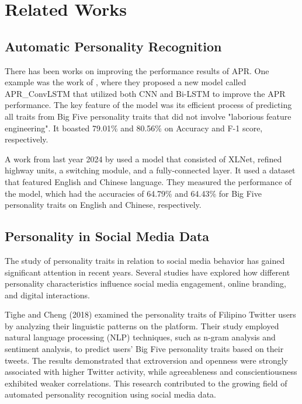 %
%
%                 

\chapter{Related Works}
\label{sec:Related Works}

\section {Automatic Personality Recognition}
\label{sec: APRecognition}
There has been works on improving the performance results of APR. One example was the work of \citet{Aljuhani_Al-Malaise Al-Ghamdi_Alghamdi_Saleem_2025}, where they proposed a new model called APR_ConvLSTM that utilized both CNN and Bi-LSTM to improve the APR performance. The key feature of the model was its efficient process of predicting all traits from Big Five personality traits that did not involve "laborious feature engineering". It boasted 79.01\% and 80.56\% on Accuracy and F-1 score, respectively.

A work from last year 2024 by \citet{Chen_Tsai_Ha_2024} used a model that consisted of XLNet, refined highway units, a switching module, and a fully-connected layer. It used a dataset that featured English and Chinese language. They measured the performance of the model, which had the accuracies of 64.79\% and 64.43\% for Big Five personality traits on English and Chinese, respectively.

\section{Personality in Social Media Data}
\label{sec:Personality}
The study of personality traits in relation to social media behavior has gained significant attention in recent years. Several studies have explored how different personality characteristics influence social media engagement, online branding, and digital interactions.

Tighe and Cheng (2018) examined the personality traits of Filipino Twitter users by analyzing their linguistic patterns on the platform. Their study employed natural language processing (NLP) techniques, such as n-gram analysis and sentiment analysis, to predict users' Big Five personality traits based on their tweets. The results demonstrated that extroversion and openness were strongly associated with higher Twitter activity, while agreeableness and conscientiousness exhibited weaker correlations. This research contributed to the growing field of automated personality recognition using social media data.

